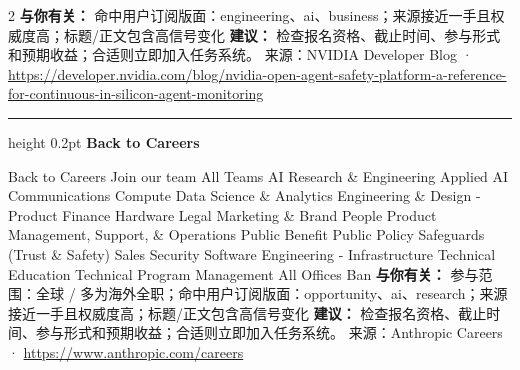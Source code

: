 \documentclass[10.5pt]{ctexart}
\begin{document}
\begin{multicols}{2}
\textbf{与你有关：} 命中用户订阅版面：engineering、ai、business；来源接近一手且权威度高；标题/正文包含高信号变化
\textbf{建议：} 检查报名资格、截止时间、参与形式和预期收益；合适则立即加入任务系统。
{\footnotesize\color{ormuted} 来源：NVIDIA Developer Blog · \url{https://developer.nvidia.com/blog/nvidia-open-agent-safety-platform-a-reference-for-continuous-in-silicon-agent-monitoring}}
\vspace{2mm}
\hrule height 0.2pt
\vspace{2mm}
{\large\bfseries Back to Careers}\par
Back to Careers Join our team All Teams AI Research \& Engineering Applied AI Communications Compute Data Science \& Analytics Engineering \& Design - Product Finance Hardware Legal Marketing \& Brand People Product Management, Support, \& Operations Public Benefit Public Policy Safeguards (Trust \& Safety) Sales Security Software Engineering - Infrastructure Technical Education Technical Program Management All Offices Ban
\textbf{与你有关：} 参与范围：全球 / 多为海外全职；命中用户订阅版面：opportunity、ai、research；来源接近一手且权威度高；标题/正文包含高信号变化
\textbf{建议：} 检查报名资格、截止时间、参与形式和预期收益；合适则立即加入任务系统。
{\footnotesize\color{ormuted} 来源：Anthropic Careers · \url{https://www.anthropic.com/careers}}
\end{multicols}
\end{document}
